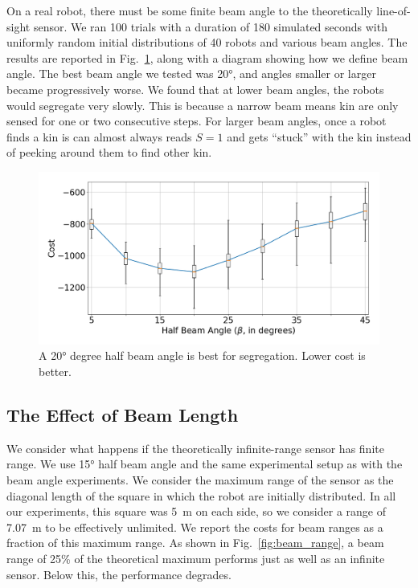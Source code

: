 \documentclass[letterpaper, 10 pt, conference]{ieeeconf}
\begin{document}
On a real robot, there must be some finite beam angle to the theoretically
line-of-sight sensor. We ran 100 trials with a duration of 180 simulated seconds
with uniformly random initial distributions of 40 robots and various beam
angles. The results are reported in Fig.~\ref{fig:beam_angle}, along with a
diagram showing how we define beam angle. The best beam angle we tested was
\ang{20}, and angles smaller or larger became progressively worse. We found that
at lower beam angles, the robots would segregate very slowly. This is because a narrow beam
means kin are only sensed for one or two consecutive steps.
For larger beam angles, once a robot finds a kin is can almost always reads $S=1$
and gets ``stuck'' with the kin instead of peeking around them to find other kin.

\begin{figure}[t]
  \centering
  \includegraphics[width=0.9\linewidth]{./images/beam_angle}
  \caption{A \ang{20} degree half beam angle is best for segregation. Lower cost
    is better.}
  \label{fig:beam_angle}
\end{figure}

\subsection{The Effect of Beam Length} \label{section:beam_range}

We consider what happens if the theoretically infinite-range sensor has finite
range. We use \ang{15} half beam angle and the same experimental setup as with
the beam angle experiments. We consider the maximum range of the sensor as the
diagonal length of the square in which the robot are initially distributed. In
all our experiments, this square was \SI{5}{\meter} on each side, so we consider
a range of \SI{7.07}{\meter} to be effectively unlimited. We report the costs
for beam ranges as a fraction of this maximum range. As shown in
Fig.~\ref{fig:beam_range}, a beam range of 25\% of the theoretical maximum
performs just as well as an infinite sensor. Below this, the performance
degrades.
\end{document}
